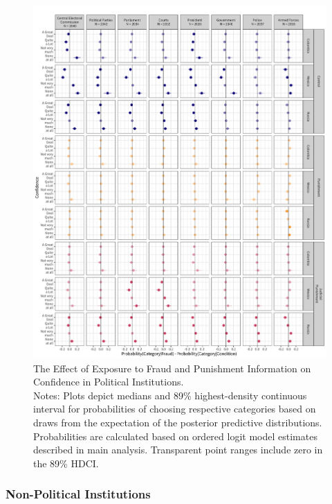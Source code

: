 \documentclass[11pt, ngerman,english,a4]{article}
\begin{document}
    
\begin{figure}[H]
	\centering
	\includegraphics[width=\linewidth,trim=4 4 4 4,clip]{figs/diffs_pooled_int.png}
	\caption{The Effect of Exposure to Fraud and Punishment Information on Confidence in Political Institutions.  \\
		\footnotesize{Notes: Plots depict medians and 89\% highest-density continuous interval for probabilities of choosing respective categories based on draws from the expectation of the posterior predictive distributions. Probabilities are calculated based on ordered logit model estimates described in main analysis.
			Transparent point ranges include zero in the 89\% HDCI.
	} }
	\singlespacing
	\raggedright
		\label{fig:diffs-pooled-int}
\end{figure}
    

\clearpage

\subsubsection*{Non-Political Institutions}
\end{document}
